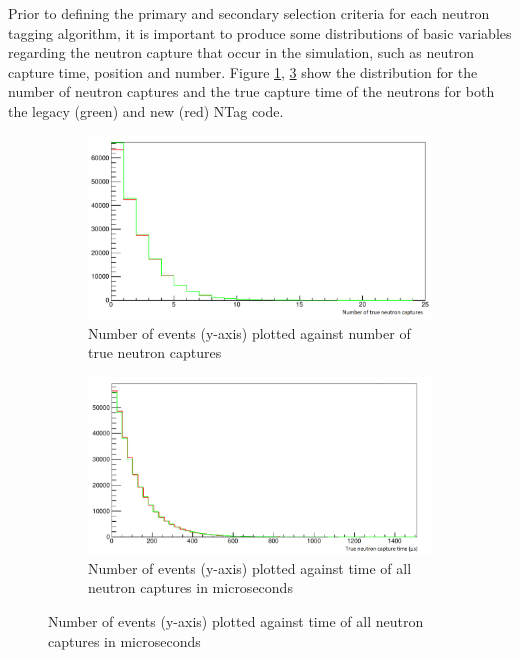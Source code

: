 Prior to defining the primary and secondary selection criteria for each neutron tagging algorithm, it is important to produce some distributions of basic variables regarding the neutron capture that occur in the simulation, such as neutron capture time, position and number. Figure \ref{fig:NTrueCaptures}, \ref{fig:TrueCaptureTime} show the distribution for the number of neutron captures and the true capture time of the neutrons for both the legacy (green) and new (red) NTag code.  

\begin{figure}
    \centering
     \begin{subfigure}[b]{0.45\linewidth}
      \includegraphics[width=\linewidth]{Figures/NTrueCaptures.PNG}
      \caption{Number of events (y-axis) plotted against number of true neutron captures}
      \label{fig:NTrueCaptures} 
     \end{subfigure}
     \begin{subfigure}[b]{0.45\linewidth}
       \includegraphics[width=\linewidth]{Figures/TrueCaptureTime.PNG}
        \caption{Number of events (y-axis) plotted against time of all neutron captures in microseconds} 
     \label{fig:TrueCaptureTime}
      \end{subfigure} 
\end{figure}

